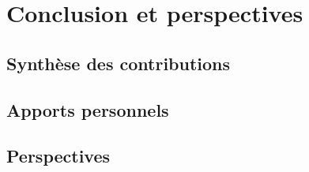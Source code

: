 \chapter{Conclusion et perspectives}

\section{Synthèse des contributions}

\section{Apports personnels}

\section{Perspectives}

